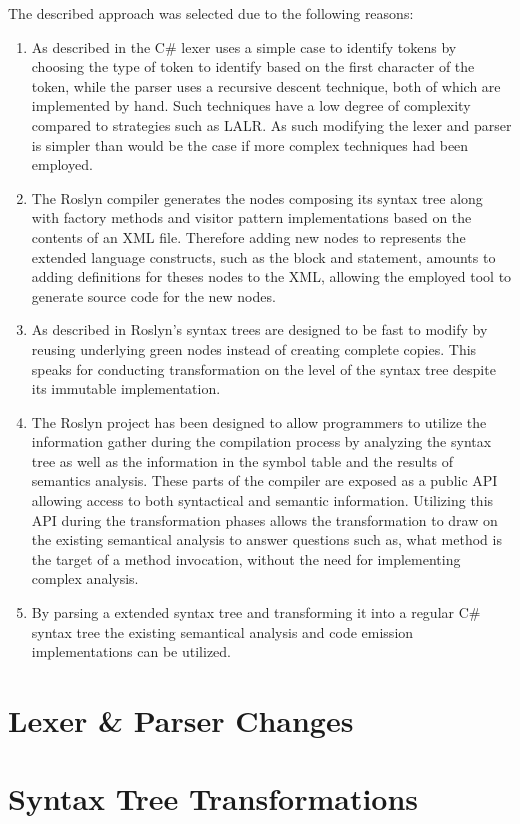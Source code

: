 The described approach was selected due to the following reasons:
\begin{enumerate}
\item As described in  the C\# lexer  uses a simple  case to identify tokens by choosing the type of token to identify based on the first character of the token, while the parser uses a recursive descent technique, both of which are implemented by hand. Such techniques have a low degree of complexity compared to strategies such as \ac{LALR}. As such modifying the lexer and parser is simpler than would be the case if more complex techniques had been employed.
\item The Roslyn compiler generates the nodes composing its syntax tree along with factory methods and visitor pattern implementations based on the contents of an \ac{XML} file. Therefore adding new nodes to represents the extended language constructs, such as the  block and  statement, amounts to adding definitions for theses nodes to the \ac{XML}, allowing the employed tool to generate source code for the new nodes.
\item As described in  Roslyn's syntax trees are designed to be fast to modify by reusing underlying green nodes instead of creating complete copies\cite[p. 6]{ng2012roslyn}. This speaks for conducting transformation on the level of the syntax tree despite its immutable implementation.
\item The Roslyn project has been designed to allow programmers to utilize the information gather during the compilation process by analyzing the syntax tree as well as the information in the symbol table and the results of semantics analysis. These parts of the compiler are exposed as a public \ac{API} allowing access to both syntactical and semantic information. Utilizing this \ac{API} during the transformation phases allows the transformation to draw on the existing semantical analysis to answer questions such as, what method is the target of a method invocation, without the need for implementing complex analysis.
\item By parsing a extended syntax tree and transforming it into a regular C\# syntax tree the existing semantical analysis and code emission implementations can be utilized.
\end{enumerate}

\section{Lexer \& Parser Changes}
\label{sec:roslyn_lexer_parser_changes}


\section{Syntax Tree Transformations}
\label{sec:syntax_tree_transformations}
\worksheetend